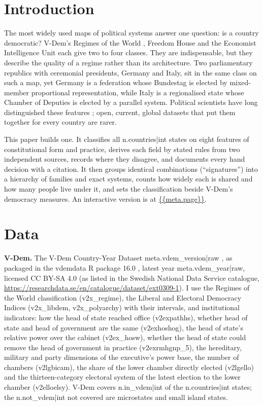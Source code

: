 \documentclass[11pt,a4paper]{article}
\begin{document}
\section{Introduction}
The most widely used maps of political systems answer one question: is a country democratic? V-Dem's Regimes of the World \citep{row}, Freedom House and the Economist Intelligence Unit each give two to four classes. They are indispensable, but they describe the quality of a regime rather than its architecture. Two parliamentary republics with ceremonial presidents, Germany and Italy, sit in the same class on such a map, yet Germany is a federation whose Bundestag is elected by mixed-member proportional representation, while Italy is a regionalised state whose Chamber of Deputies is elected by a parallel system. Political scientists have long distinguished these features \citep{lijphart,shugartcarey,elgie2011,reynolds}; open, current, global datasets that put them together for every country are rarer.

This paper builds one. It classifies all {{n.countries|int}} states on eight features of constitutional form and practice, derives each field by stated rules from two independent sources, records where they disagree, and documents every hand decision with a citation. It then groups identical combinations (``signatures'') into a hierarchy of families and exact systems, counts how widely each is shared and how many people live under it, and sets the classification beside V-Dem's democracy measures. An interactive version is at \url{{{meta.page}}}.

\section{Data}
\textbf{V-Dem.} The V-Dem Country-Year Dataset {{meta.vdem_version|raw}} \citep{vdem}, as packaged in the vdemdata R package 16.0 \citep{vdemdata}, latest year {{meta.vdem_year|raw}}, licensed CC BY-SA 4.0 (as listed in the Swedish National Data Service catalogue, \url{https://researchdata.se/en/catalogue/dataset/ext0309-1}). I use the Regimes of the World classification (v2x\_regime), the Liberal and Electoral Democracy Indices (v2x\_libdem, v2x\_polyarchy) with their intervals, and institutional indicators: how the head of state reached office (v2expathhs), whether head of state and head of government are the same (v2exhoshog), the head of state's relative power over the cabinet (v2ex\_hosw), whether the head of state could remove the head of government in practice (v2exrmhgnp\_5), the hereditary, military and party dimensions of the executive's power base, the number of chambers (v2lgbicam), the share of the lower chamber directly elected (v2lgello) and the thirteen-category electoral system of the latest election to the lower chamber (v2elloelsy). V-Dem covers {{n.in_vdem|int}} of the {{n.countries|int}} states; the {{n.not_vdem|int}} not covered are microstates and small island states.
\end{document}
